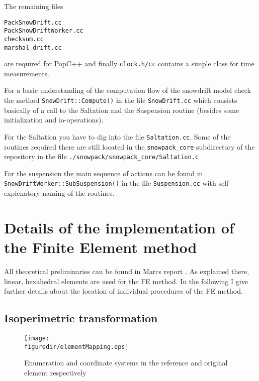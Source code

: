 \documentclass[12pt]{report}
\def\figuredir{./figures}
\begin{document}
The remaining files 
\begin{verbatim}
PackSnowDrift.cc
PackSnowDriftWorker.cc
checksum.cc
marshal_drift.cc
\end{verbatim}
are required for PopC++ and finally \verb+clock.h/cc+ contains a
simple class for time measurements.

For a basic understanding of the computation flow of the snowdrift
model check the method \verb+SnowDrift::Compute()+ in the file
\verb+SnowDrift.cc+ which consists basically of a call to the
Saltation and the Suspension routine (besides some initialization and
io-operations).

For the Saltation you have to dig into the file \verb+Saltation.cc+.
Some of the routines required there are still located in the
\verb+snowpack_core+ subdirectory of the repository in the file
\verb+./snowpack/snowpack_core/Saltation.c+

For the suspension the main sequence of actions can be found in
\\\verb+SnowDriftWorker::SubSuspension()+ in the file
\verb+Suspension.cc+ with self-explenatory naming of the routines.


\section{Details of the implementation of the Finite Element method}
All theoretical preliminaries can be found in Marcs report
\cite{ryser_2004}. As explained there, linear, hexahedral elements are
used for the FE method. In the following I give further details about
the location of individual procedures of the FE method.

\subsection{Isoperimetric transformation}
\begin{figure}[t]
  \begin{center}
    \noindent\texttt{[image: \\figuredir/elementMapping.eps]}
  \end{center}
  \caption{Enumeration and coordinate systems in the reference and
    original element respectively}
  \label{iso}
\end{figure}
\end{document}
